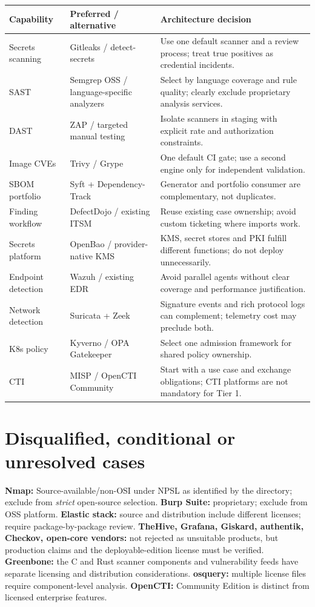 \documentclass[11pt,oneside]{report}
\begin{document}
\noindent\begin{tabularx}{\textwidth}{P{0.25\textwidth}P{0.25\textwidth}Y}
\toprule Capability & Preferred / alternative & Architecture decision\\\midrule
Secrets scanning & Gitleaks / detect-secrets & Use one default scanner and a review process; treat true positives as credential incidents.\\
SAST & Semgrep OSS / language-specific analyzers & Select by language coverage and rule quality; clearly exclude proprietary analysis services.\\
DAST & ZAP / targeted manual testing & Isolate scanners in staging with explicit rate and authorization constraints.\\
Image CVEs & Trivy / Grype & One default CI gate; use a second engine only for independent validation.\\
SBOM portfolio & Syft + Dependency-Track & Generator and portfolio consumer are complementary, not duplicates.\\
Finding workflow & DefectDojo / existing ITSM & Reuse existing case ownership; avoid custom ticketing where imports work.\\
Secrets platform & OpenBao / provider-native KMS & KMS, secret stores and PKI fulfill different functions; do not deploy unnecessarily.\\
Endpoint detection & Wazuh / existing EDR & Avoid parallel agents without clear coverage and performance justification.\\
Network detection & Suricata + Zeek & Signature events and rich protocol logs can complement; telemetry cost may preclude both.\\
K8s policy & Kyverno / OPA Gatekeeper & Select one admission framework for shared policy ownership.\\
CTI & MISP / OpenCTI Community & Start with a use case and exchange obligations; CTI platforms are not mandatory for Tier 1.\\
\bottomrule
\end{tabularx}
\section{Disqualified, conditional or unresolved cases}
\textbf{Nmap:} Source-available/non-OSI under NPSL as identified by the directory; exclude from \emph{strict} open-source selection. \textbf{Burp Suite:} proprietary; exclude from OSS platform. \textbf{Elastic stack:} source and distribution include different licenses; require package-by-package review. \textbf{TheHive, Grafana, Giskard, authentik, Checkov, open-core vendors:} not rejected as unsuitable products, but production claims and the deployable-edition license must be verified. \textbf{Greenbone:} the C and Rust scanner components and vulnerability feeds have separate licensing and distribution considerations. \textbf{osquery:} multiple license files require component-level analysis. \textbf{OpenCTI:} Community Edition is distinct from licensed enterprise features.
\end{document}
